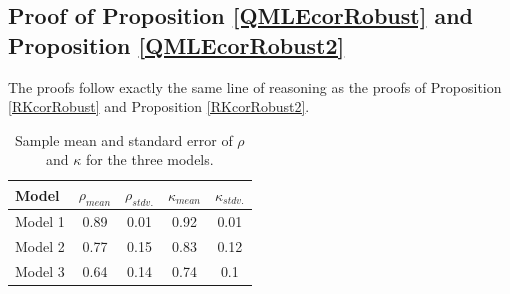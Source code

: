 \documentclass[11pt]{article}
\numberwithin{equation}{section}
\theoremstyle{plain}
\theoremstyle{remark}
\begin{document}
\subsection{Proof of Proposition \ref{QMLEcorRobust} and Proposition \ref{QMLEcorRobust2}}
The proofs follow exactly the same line of reasoning as the proofs of Proposition \ref{RKcorRobust} and Proposition \ref{RKcorRobust2}.



\newpage
\begin{table}[h]
\centering
\caption{Sample mean and standard error of $\rho$ and $\kappa$ for the three models.}
\label{tableRho}
\begin{tabular}{lcccc}
\toprule
\toprule
Model   & $\rho_{mean}$ & $\rho_{stdv.}$ &$\kappa_{mean}$& $\kappa_{stdv.}$  \\
\toprule
Model 1 & 0.89  & 0.01  & 0.92 & 0.01 \\
Model 2 & 0.77  & 0.15  & 0.83 & 0.12\\
Model 3 & 0.64  & 0.14  & 0.74 & 0.1 \\
\bottomrule
\end{tabular}
\end{table}
\end{document}
